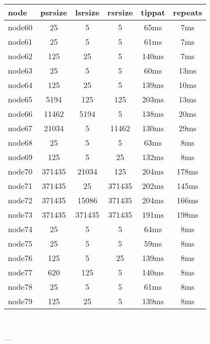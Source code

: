 \begin{tabular}{|l|c|c|c|c|c|}
\hline node & psrsize & lsrsize & rsrsize   & tippat & repeats\\
    \hline node60 & 25 & 5 & 5 & 65ms & 7ms\\
    \hline node61 & 25 & 5 & 5 & 61ms & 7ms\\
    \hline node62 & 125 & 25 & 5 & 140ms & 7ms\\
    \hline node63 & 25 & 5 & 5 & 60ms & 13ms\\
    \hline node64 & 125 & 25 & 5 & 139ms & 10ms\\
    \hline node65 & 5194 & 125 & 125 & 203ms & 13ms\\
    \hline node66 & 11462 & 5194 & 5 & 138ms & 20ms\\
    \hline node67 & 21034 & 5 & 11462 & 130ms & 29ms\\
    \hline node68 & 25 & 5 & 5 & 63ms & 8ms\\
    \hline node69 & 125 & 5 & 25 & 132ms & 8ms\\
    \hline node70 & 371435 & 21034 & 125 & 204ms & 178ms\\
    \hline node71 & 371435 & 25 & 371435 & 202ms & 145ms\\
    \hline node72 & 371435 & 15086 & 371435 & 204ms & 166ms\\
    \hline node73 & 371435 & 371435 & 371435 & 191ms & 198ms\\
    \hline node74 & 25 & 5 & 5 & 64ms & 8ms\\
    \hline node75 & 25 & 5 & 5 & 59ms & 8ms\\
    \hline node76 & 125 & 5 & 25 & 139ms & 8ms\\
    \hline node77 & 620 & 125 & 5 & 140ms & 8ms\\
    \hline node78 & 25 & 5 & 5 & 61ms & 8ms\\
    \hline node79 & 125 & 25 & 5 & 139ms & 8ms\\

\hline
\end{tabular} \

---


